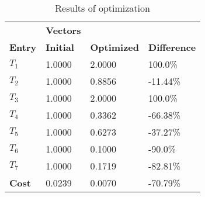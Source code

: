 \begin{table}[H]
\centering
\begin{tabular}{llll}
\textbf{}      & \cellcolor[HTML]{EFEFEF}\textbf{Vectors} & \textbf{} & \textbf{}         \\
\rowcolor[HTML]{EFEFEF} 
\textbf{Entry} & \textbf{Initial} & \textbf{Optimized} & \textbf{Difference} \\
$T_1$ & 1.0000 & 2.0000 & 100.0\% \\ 
$T_2$ & 1.0000 & 0.8856 & -11.44\% \\ 
$T_3$ & 1.0000 & 2.0000 & 100.0\% \\ 
$T_4$ & 1.0000 & 0.3362 & -66.38\% \\ 
$T_5$ & 1.0000 & 0.6273 & -37.27\% \\ 
$T_6$ & 1.0000 & 0.1000 & -90.0\% \\ 
$T_7$ & 1.0000 & 0.1719 & -82.81\% \\ 
\rowcolor[HTML]{EFEFEF} 
\textbf{Cost}  & 0.0239 & 0.0070 & -70.79\% \\ 
\end{tabular}
\caption{Results of optimization}
\label{tab:OptimizationAnalysis}
\end{table}